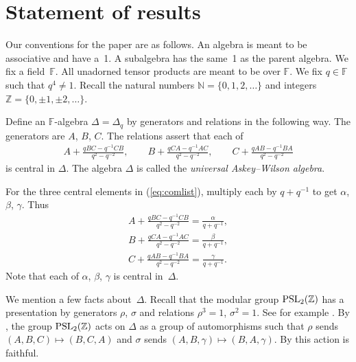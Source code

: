 \section{Statement of results}\label{section2}

Our conventions for the paper are as follows.
An algebra is meant to be associative and have a~1.
A subalgebra has the same~1 as the parent algebra.
We f\/ix a f\/ield~$\mathbb F$. All unadorned tensor products
are meant to be over $\mathbb F$. We f\/ix $q \in \mathbb F$ such that
$q^4\not=1$. Recall the natural numbers
$\mathbb N = \lbrace 0,1,2,\ldots \rbrace$ and
integers $\mathbb Z=\lbrace 0, \pm 1, \pm 2,\ldots \rbrace$.

\begin{Definition}
\label{def:uaw}
Def\/ine an $\mathbb F$-algebra
$\Delta=\Delta_q$
by generators and relations in the following way.
The generators are $A$, $B$, $C$.
The relations assert that each of
\begin{gather}
 A+ \frac{qBC-q^{-1}CB}{q^2-q^{-2}},
\qquad B+
\frac{qCA-q^{-1}AC}{q^2-q^{-2}},
\qquad
C+
\frac{qAB-q^{-1}BA}{q^2-q^{-2}}
\label{eq:comlist}
\end{gather}
is central in $\Delta$.
The algebra
$\Delta$ is called the {\it universal Askey--Wilson algebra}.
\end{Definition}

\begin{Definition}
\label{def:abc}
For the
three central elements in
(\ref{eq:comlist}), multiply each by $q+q^{-1}$ to get
$\alpha$, $\beta$, $\gamma$. Thus
\begin{gather}
A+ \frac{qBC-q^{-1}CB}{q^2-q^{-2}}
 =
\frac{\alpha}{q+q^{-1}},
\label{eq:u1}
\\
B+
\frac{qCA-q^{-1}AC}{q^2-q^{-2}}
 =
\frac{\beta}{q+q^{-1}},
\label{eq:u2}
\\
C+
\frac{qAB-q^{-1}BA}{q^2-q^{-2}}
 =
\frac{\gamma}{q+q^{-1}}.
\label{eq:u3}
\end{gather}
Note that each of $\alpha$, $\beta$, $\gamma$ is central in~$\Delta$.
\end{Definition}

We mention a few facts about~$\Delta$.
Recall that the modular group
${\rm  {PSL}}_2(\mathbb Z)$ has a presentation
by generators $\rho$, $\sigma$ and relations
$\rho^3=1$, $\sigma^2=1$. See for example
\cite{alpern}.
By \cite[Theorem~3.1]{uaw},
the group
${\rm  {PSL}}_2(\mathbb Z)$ acts on
$\Delta$ as a group of automorphisms
such that
$\rho$
 sends
$(A,B,C)\mapsto (B,C,A)$
and  $\sigma $
sends
$(A,B,\gamma)\mapsto (B,A,\gamma)$.
By
\cite[Theorem~3.13]{uaw}
this action is faithful.


